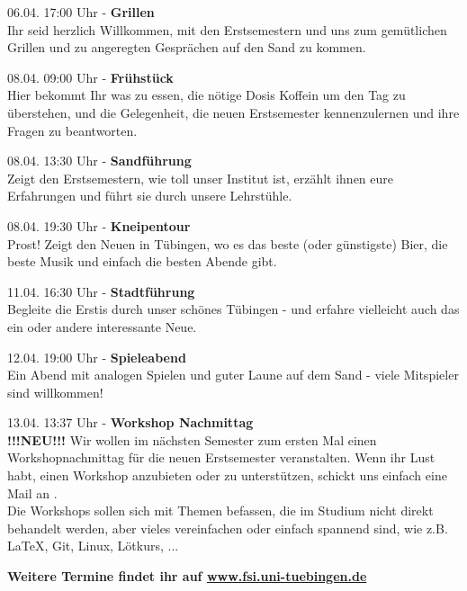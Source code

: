 \large 06.04. 17:00 Uhr - \textbf{Grillen}\\
\normalsize
Ihr seid herzlich Willkommen, mit den Erstsemestern und uns zum gemütlichen Grillen und zu angeregten Gesprächen auf den Sand zu kommen.

\large 08.04. 09:00 Uhr - \textbf{Frühstück}\\
\normalsize
Hier bekommt Ihr was zu essen, die nötige Dosis Koffein um den Tag zu überstehen, und die Gelegenheit, die neuen Erstsemester kennenzulernen und ihre Fragen zu beantworten.

\large 08.04. 13:30 Uhr - \textbf{Sandführung}\\
\normalsize
Zeigt den Erstsemestern, wie toll unser Institut ist, erzählt ihnen eure Erfahrungen und führt sie durch unsere Lehrstühle.

\large 08.04. 19:30 Uhr - \textbf{Kneipentour}\\
\normalsize
Prost! Zeigt den Neuen in Tübingen, wo es das beste (oder günstigste) Bier, die beste Musik und einfach die besten Abende gibt. 

\large 11.04. 16:30 Uhr - \textbf{Stadtführung}\\
\normalsize
Begleite die Erstis durch unser schönes Tübingen - und erfahre vielleicht auch das ein oder andere interessante Neue.

\large 12.04. 19:00 Uhr - \textbf{Spieleabend}\\
\normalsize
Ein Abend mit analogen Spielen und guter Laune auf dem Sand - viele Mitspieler sind willkommen!

\large 13.04. 13:37 Uhr - \textbf{Workshop Nachmittag}\\
\normalsize
\textbf{!!!NEU!!!} 	Wir wollen im nächsten Semester zum ersten Mal einen Workshopnachmittag für die neuen Erstsemester veranstalten. Wenn ihr Lust habt, einen Workshop anzubieten oder zu unterstützen, schickt uns einfach eine Mail an .\\
Die Workshops sollen sich mit Themen befassen, die im Studium nicht direkt behandelt werden, aber vieles vereinfachen oder einfach spannend sind, wie z.B. \LaTeX, Git, Linux, Lötkurs, ... 

\vfill
\centering \large \textbf{Weitere Termine findet ihr auf \url{www.fsi.uni-tuebingen.de}}